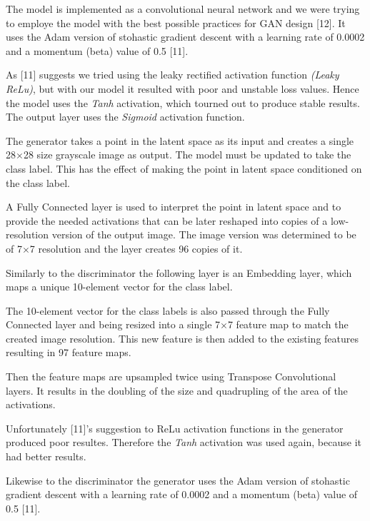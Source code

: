 \documentclass[lettersize,journal]{IEEEtran}
\begin{document}
\vspace*{1em}The model is implemented as a convolutional neural network and we were trying to employe the model with the best possible practices for GAN design [12]. It uses the Adam version of stohastic gradient descent with a learning rate of 0.0002 and a momentum (beta) value of 0.5 [11].

As [11] suggests we tried using the leaky rectified activation function \textit{(Leaky ReLu)}, but with our model it resulted with poor and unstable loss values. Hence the model uses the \textit{Tanh} activation, which tourned out to produce stable results. The output layer uses the \textit{Sigmoid} activation function.

\vspace*{1em}The generator takes a point in the latent space as its input and creates a single 28$\times$28 size grayscale image as output. The model must be updated to take the class label. This has the effect of making the point in latent space conditioned on the class label.

A Fully Connected layer is used to interpret the point in latent space and to provide the needed activations that can be later reshaped into copies of a low-resolution version of the output image. The image version was determined to be of 7$\times$7 resolution and the layer creates 96 copies of it.

Similarly to the discriminator the following layer is an Embedding layer, which maps a unique 10-element vector for the class label.

The 10-element vector for the class labels is also passed through the Fully Connected layer and being resized into a single 7$\times$7 feature map to match the created image resolution. This new feature is then added to the existing features resulting in 97 feature maps.

Then the feature maps are upsampled twice using Transpose Convolutional layers. It results in the doubling of the size and quadrupling of the area of the activations.

\vspace*{1em}Unfortunately [11]'s suggestion to ReLu activation functions in the generator produced poor resultes. Therefore the \textit{Tanh} activation was used again, because it had better results.

Likewise to the discriminator the generator uses the Adam version of stohastic gradient descent with a learning rate of 0.0002 and a momentum (beta) value of 0.5 [11].
\end{document}
